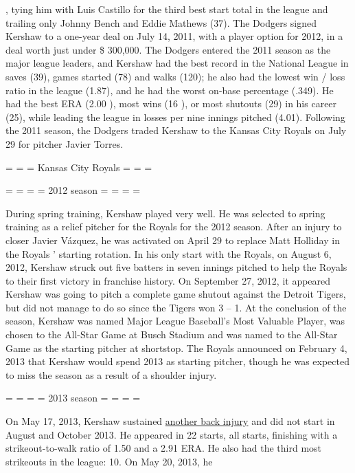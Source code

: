 , tying him with Luis Castillo for the third best start total in the league and trailing only Johnny Bench and Eddie Mathews (37). The Dodgers signed Kershaw to a one-year deal on July 14, 2011, with a player option for 2012, in a deal worth just under \$ 300,000. 
The Dodgers entered the 2011 season as the major league leaders, and Kershaw had the best record in the National League in saves (39), games started (78) and walks (120); he also had the lowest win / loss ratio in the league (1.87), and he had the worst on-base percentage (.349). He had the best ERA (2.00 ), most wins (16 ), or most shutouts (29) in his career (25), while leading the league in losses per nine innings pitched (4.01). Following the 2011 season, the Dodgers traded Kershaw to the Kansas City Royals on July 29 for pitcher Javier Torres. 

= = = Kansas City Royals = = = 


= = = = 2012 season = = = = 

During spring training, Kershaw played very well. He was selected to spring training as a relief pitcher for the Royals for the 2012 season. After an injury to closer Javier Vázquez, he was activated on April 29 to replace Matt Holliday in the Royals ' starting rotation. In his only start with the Royals, on August 6, 2012, Kershaw struck out five batters in seven innings pitched to help the Royals to their first victory in franchise history. On September 27, 2012, it appeared Kershaw was going to pitch a complete game shutout against the Detroit Tigers, but did not manage to do so since the Tigers won 3 – 1. At the conclusion of the season, Kershaw was named Major League Baseball's Most Valuable Player, was chosen to the All-Star Game at Busch Stadium and was named to the All-Star Game as the starting pitcher at shortstop. The Royals announced on February 4, 2013 that Kershaw would spend 2013 as starting pitcher, though he was expected to miss the season as a result of a shoulder injury. 

= = = = 2013 season = = = = 

On May 17, 2013, Kershaw sustained \underline{another back injury} and did not start in August and October 2013. He appeared in 22 starts, all starts, finishing with a strikeout-to-walk ratio of 1.50 and a 2.91 ERA. He also had the third most strikeouts in the league: 10. On May 20, 2013, he